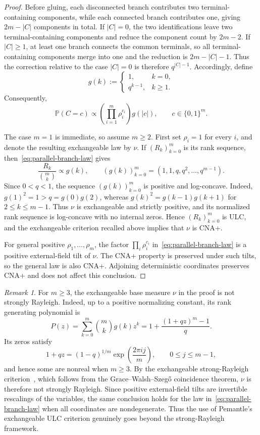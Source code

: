 \documentclass[11pt]{amsart}
\theoremstyle{plain}
\theoremstyle{definition}
\theoremstyle{remark}
\newtheorem{remark}[theorem]{Remark}
\begin{document}
\begin{proof}
Before gluing, each disconnected branch contributes two terminal-containing components, while each connected branch contributes one, giving $2m-|C|$ components in total. If $|C|=0$, the two identifications leave two terminal-containing components and reduce the component count by $2m-2$. If $|C|\ge1$, at least one branch connects the common terminals, so all terminal-containing components merge into one and the reduction is $2m-|C|-1$. Thus the correction relative to the case $|C|=0$ is therefore $q^{|C|-1}$. Accordingly, define
\[
    g(k)
    :=
    \begin{cases}
        1, & k=0,\\
        q^{k-1}, & k\ge1.
    \end{cases}
\]
Consequently,
\begin{equation}
\label{eq:parallel-branch-law}
    \mathbb P(C=c)
    \propto
    \left(
        \prod_{i=1}^m \rho_i^{c_i}
    \right)
    g(|c|),
    \qquad
    c\in\{0,1\}^m.
\end{equation}

The case $m=1$ is immediate, so assume $m\ge2$. First set $\rho_i=1$ for every $i$, and denote the resulting exchangeable law by $\nu$. If $(R_k)_{k=0}^m$ is its rank sequence, then~\eqref{eq:parallel-branch-law} gives
\[
    \frac{R_k}{\binom{m}{k}}
    \propto
    g(k),
    \qquad
    (g(k))_{k=0}^m
    =
    (1,1,q,q^2,\ldots,q^{m-1}).
\]
Since $0<q<1$, the sequence $(g(k))_{k=0}^m$ is positive and log-concave. Indeed, $g(1)^2=1>q=g(0)g(2)$, whereas $g(k)^2=g(k-1)g(k+1)$ for $2\le k\le m-1$. Thus $\nu$ is exchangeable and strictly positive, and its normalized rank sequence is log-concave with no internal zeros. Hence $(R_k)_{k=0}^m$ is ULC, and the exchangeable criterion recalled above implies that $\nu$ is CNA+.

For general positive $\rho_1,\ldots,\rho_m$, the factor $\prod_i\rho_i^{c_i}$ in~\eqref{eq:parallel-branch-law} is a positive external-field tilt of $\nu$. The CNA+ property is preserved under such tilts, so the general law is also CNA+. Adjoining deterministic coordinates preserves CNA+ and does not affect this conclusion.
\end{proof}

\begin{remark}
For $m\ge3$, the exchangeable base measure $\nu$ in the proof is not strongly Rayleigh. Indeed, up to a positive normalizing constant, its rank generating polynomial is
\[
    P(z)
    =
    \sum_{k=0}^m
    \binom{m}{k}g(k)z^k
    =
    1+\frac{(1+qz)^m-1}{q}.
\]
Its zeros satisfy
\[
    1+qz
    =
    (1-q)^{1/m}
    \exp\left(\frac{2\pi i j}{m}\right),
    \qquad
    0\le j\le m-1,
\]
and hence some are nonreal when $m\ge3$. By the exchangeable strong-Rayleigh criterion~\cite[Theorem~3.8]{borceaBrandenLiggett2009}, which follows from the Grace--Walsh--Szeg\H{o} coincidence theorem, $\nu$ is therefore not strongly Rayleigh. Since positive external-field tilts are invertible rescalings of the variables, the same conclusion holds for the law in~\eqref{eq:parallel-branch-law} when all coordinates are nondegenerate. Thus the use of Pemantle's exchangeable ULC criterion genuinely goes beyond the strong-Rayleigh framework.
\end{remark}
\end{document}
